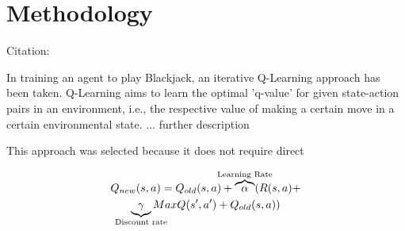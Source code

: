 \section{Methodology}

Citation: \cite{Rummery1995ProblemSW}

In training an agent to play Blackjack, an iterative Q-Learning approach has been taken. Q-Learning aims to learn the optimal 'q-value' for given state-action pairs in an environment, i.e., the respective value of making a certain move in a certain environmental state. ... further description

This approach was selected because it does not require direct 


\begin{multline}
    Q_{new}(s,a)=Q_{old}(s,a)+\overbrace{\alpha}^{\mathclap{\text{Learning Rate}}}(R(s,a)+\\ \underbrace{\gamma}_{\mathclap{\text{Discount rate}}}MaxQ(s',a')+Q_{old}(s,a))
\end{multline}